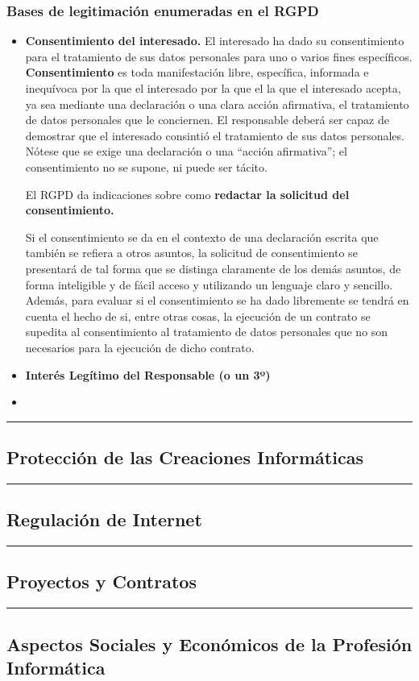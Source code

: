 \documentclass[spanish, 12pt, a4paper, twoside]{article}
\begin{document}
\subsubsection{Bases de legitimación enumeradas en el RGPD}

\begin{itemize}
    \item \textbf{Consentimiento del interesado.} El interesado ha dado su consentimiento para el tratamiento de sus datos personales para uno o varios fines específicos. \textbf{Consentimiento } es toda manifestación libre, específica, informada e inequívoca por la que el interesado por la que el la que el interesado acepta, ya sea mediante una declaración o una clara acción afirmativa, el tratamiento de datos personales que le conciernen. El responsable deberá ser capaz de demostrar que el interesado consintió el tratamiento de sus datos personales. Nótese que se exige una declaración o una “acción afirmativa”; el consentimiento no se supone, ni puede ser tácito.
    
    El RGPD da indicaciones sobre como \textbf{redactar la solicitud del consentimiento.}

    
    Si el consentimiento se da en el contexto de una declaración escrita que también se refiera a otros asuntos, 
    la solicitud de consentimiento se presentará de tal forma que se 
    distinga claramente de los demás asuntos, de forma inteligible y 
    de fácil acceso y utilizando un lenguaje claro y sencillo.
    Además, para evaluar si el consentimiento se ha dado libremente 
    se tendrá en cuenta el hecho de si, entre otras cosas, la ejecución
    de un contrato se supedita al consentimiento al tratamiento de datos
    personales que no son necesarios para la ejecución de dicho 
    contrato.
    \item \textbf{Interés Legítimo del Responsable (o un 3º)}
    \item 
\end{itemize}
\hfill \break
\newpage
\hrule
\subsection{Protección de las Creaciones Informáticas}

\newpage
\hrule
\subsection{Regulación de Internet}

\newpage
\hrule
\subsection{Proyectos y Contratos}

\newpage
\hrule
\subsection{Aspectos Sociales y Económicos de la Profesión Informática}
\end{document}
